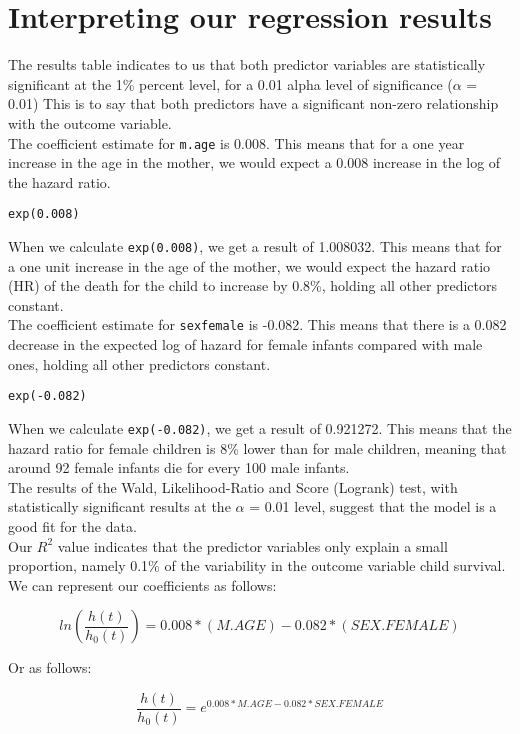 \documentclass[12pt,letterpaper]{article}
\begin{document}
\newpage


\section{Interpreting our regression results}

\noindent 
The results table indicates to us that both predictor variables are statistically significant at the 1\% percent level, for a 0.01 alpha level of significance ($\alpha$ = 0.01) This is to say that both predictors have a significant non-zero relationship with the outcome variable.
\\

\noindent
The coefficient estimate for \texttt{m.age} is 0.008. This means that for a one year increase in the age in the mother, we would expect a 0.008 increase in the log of the hazard ratio.
\\
\begin{lstlisting}
exp(0.008)
\end{lstlisting}

\noindent When we calculate \texttt{exp(0.008)}, we get a result of 1.008032. This means that for a one unit increase in the age of the mother, we would expect the hazard ratio (HR) of the death for the child to increase by 0.8\%, holding all other predictors constant.
\\

\noindent 
The coefficient estimate for \texttt{sexfemale} is -0.082. This means that there is a 0.082 decrease in the expected log of hazard for female infants compared with male ones, holding all other predictors constant. 
\\

\begin{lstlisting}
exp(-0.082)
\end{lstlisting}

\noindent 
When we calculate \texttt{exp(-0.082)}, we get a result of 0.921272. This means that the hazard ratio for female children is 8\% lower than for male children, meaning that around 92 female infants die for every 100 male infants.
\\

\noindent
The results of the Wald, Likelihood-Ratio and Score (Logrank) test, with statistically significant results at the $\alpha$ = 0.01 level, suggest that the model is a good fit for the data.
\\

\noindent
Our $R^2$ value indicates that the predictor variables only explain a small proportion, namely 0.1\% of the variability in the outcome variable child survival.
\\

\noindent We can represent our coefficients as follows:

\begin{equation}
ln({\frac{h(t)}{h_0(t)}}) = 0.008*(M.AGE)  -0.082*(SEX.FEMALE)
\end{equation}

\noindent Or as follows:

\begin{equation}
\frac{h(t)}{h_0(t)} = e^{0.008*M.AGE -0.082*SEX.FEMALE}
\end{equation}
\end{document}
